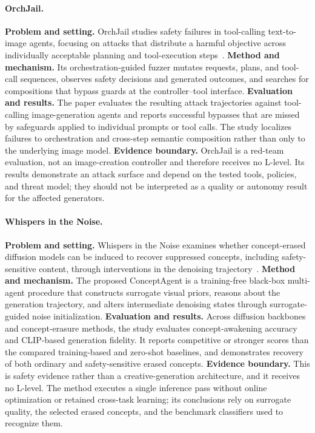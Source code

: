 \paragraph{OrchJail.}
\textbf{Problem and setting.} OrchJail studies safety failures in tool-calling text-to-image agents, focusing on attacks that distribute a harmful objective across individually acceptable planning and tool-execution steps~\cite{avg260507414}. \textbf{Method and mechanism.} Its orchestration-guided fuzzer mutates requests, plans, and tool-call sequences, observes safety decisions and generated outcomes, and searches for compositions that bypass guards at the controller--tool interface. \textbf{Evaluation and results.} The paper evaluates the resulting attack trajectories against tool-calling image-generation agents and reports successful bypasses that are missed by safeguards applied to individual prompts or tool calls. The study localizes failures to orchestration and cross-step semantic composition rather than only to the underlying image model. \textbf{Evidence boundary.} OrchJail is a red-team evaluation, not an image-creation controller and therefore receives no L-level. Its results demonstrate an attack surface and depend on the tested tools, policies, and threat model; they should not be interpreted as a quality or autonomy result for the affected generators.

\paragraph{Whispers in the Noise.}
\textbf{Problem and setting.} Whispers in the Noise examines whether concept-erased diffusion models can be induced to recover suppressed concepts, including safety-sensitive content, through interventions in the denoising trajectory~\cite{avg260518150}. \textbf{Method and mechanism.} The proposed ConceptAgent is a training-free black-box multi-agent procedure that constructs surrogate visual priors, reasons about the generation trajectory, and alters intermediate denoising states through surrogate-guided noise initialization. \textbf{Evaluation and results.} Across diffusion backbones and concept-erasure methods, the study evaluates concept-awakening accuracy and CLIP-based generation fidelity. It reports competitive or stronger scores than the compared training-based and zero-shot baselines, and demonstrates recovery of both ordinary and safety-sensitive erased concepts. \textbf{Evidence boundary.} This is safety evidence rather than a creative-generation architecture, and it receives no L-level. The method executes a single inference pass without online optimization or retained cross-task learning; its conclusions rely on surrogate quality, the selected erased concepts, and the benchmark classifiers used to recognize them.


